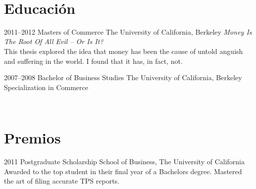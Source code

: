 \documentclass{structure}
\begin{document}
\hfill\\[0.5cm]


\section{Educación}

\begin{entrylist}



    \entry
    {2011--2012}
    {Masters {\normalfont of Commerce}}
    {The University of California, Berkeley}
    {\emph{Money Is The Root Of All Evil -- Or Is It?} \\ This thesis explored the idea that money has been the cause of untold anguish and suffering in the world. I found that it has, in fact, not.}


    \entry
    {2007--2008}
    {Bachelor {\normalfont of Business Studies}}
    {The University of California, Berkeley}
    {Specialization in Commerce}


\end{entrylist}

\hfill\\[0.5cm]



\section{Premios}

\begin{entrylist}


    \entry
    {2011}
    {Postgraduate Scholarship}
    {School of Business, The University of California}
    {Awarded to the top student in their final year of a Bachelors degree. Mastered the art of filing accurate TPS reports.}


\end{entrylist}
\end{document}
